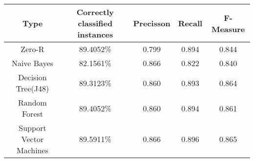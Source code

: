 \begin{center}
 \begin{tabular}{c c c c c} 
 \toprule
 Type
 	& Correctly classified instances
		& Precisson
			& Recall
				& F-Measure
\\ 
 \midrule
Zero-R
 	& 89.4052\%
		& 0.799
			& 0.894
				& 0.844
 \\
 Naive Bayes
 	& 82.1561\%
		& 0.866
			& 0.822
			& 0.840
			 \\ 

 Decision Tree(J48) 
 	& 89.3123\% & 0.860 & 0.893 & 0.864\\
	
 Random Forest
 	& 89.4052\% & 0.860 & 0.894 & 0.861\\	
 
 Support Vector Machines
 	& 89.5911\%
		& 0.866
			& 0.896
			& 0.865
\\

 \bottomrule
\end{tabular}
\end{center}